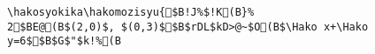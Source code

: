 \begin{verbatim}
\hakosyokika\hakomozisyu{$B!J%$!K(B}%
2$BE@(B$(2,0)$, $(0,3)$$B$rDL$kD>@~$O(B$\Hako x+\Hako y=6$$B$G$"$k!%(B
\end{verbatim}
